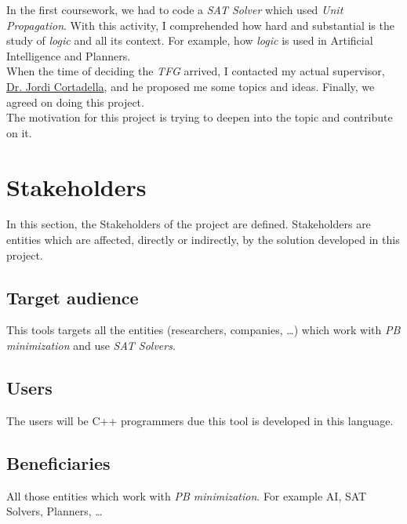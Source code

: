 In the first coursework, we had to code a \emph{SAT Solver} which used \emph{Unit Propagation}.
With this activity, I comprehended how hard and substantial is the study of \emph{logic} and all its context. For example, how \emph{logic} is used in Artificial Intelligence and Planners.\\

When the time of deciding the \emph{TFG} arrived, I contacted my actual supervisor, \href{https://www.cs.upc.edu/~jordicf/}{Dr. Jordi Cortadella}, and he proposed me some topics and ideas. Finally, we agreed on doing this project. \\

The motivation for this project is trying to deepen into the topic and contribute on it.

\section{Stakeholders}

In this section, the Stakeholders of the project are defined. Stakeholders are entities which are affected, directly or indirectly, by the solution developed in this project. 
\subsection{Target audience}
This tools targets all the entities (researchers, companies, \ldots) which work with \emph{PB minimization} and use \emph{SAT Solvers}.
\subsection{Users}
The users will be C++ programmers due this tool is developed in this language.
\subsection{Beneficiaries}
All those entities which work with \emph{PB minimization}. For example AI, SAT Solvers, Planners, \ldots